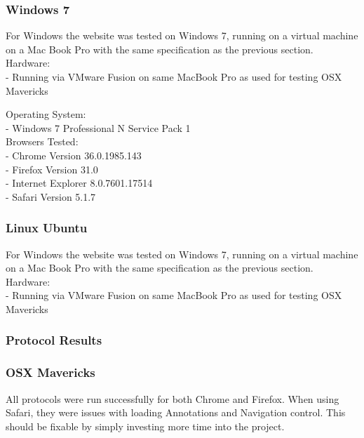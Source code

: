 \documentclass[a4paper,11pt,titlepage]{article}
\begin{document}
\subsubsection*{Windows 7}

For Windows the website was tested on Windows 7, running on a virtual machine on a Mac Book Pro with the same specification as the previous section.\\

\noindent Hardware:\\
- Running via VMware Fusion on same MacBook Pro as used for testing OSX Mavericks

\noindent Operating System:\\
- Windows 7 Professional N Service Pack 1\\

\noindent Browsers Tested:\\
- Chrome Version 36.0.1985.143\\
- Firefox Version 31.0\\
- Internet Explorer 8.0.7601.17514\\
- Safari Version 5.1.7\\


\subsubsection*{Linux Ubuntu}

For Windows the website was tested on Windows 7, running on a virtual machine on a Mac Book Pro with the same specification as the previous section.\\

\noindent Hardware:\\
- Running via VMware Fusion on same MacBook Pro as used for testing OSX Mavericks




\subsubsection{Protocol Results}

\subsubsection*{OSX Mavericks}

All protocols were run successfully for both Chrome and Firefox. When using Safari, they were issues with loading Annotations and Navigation control. This should be fixable by simply investing more time into the project.\\
\end{document}
